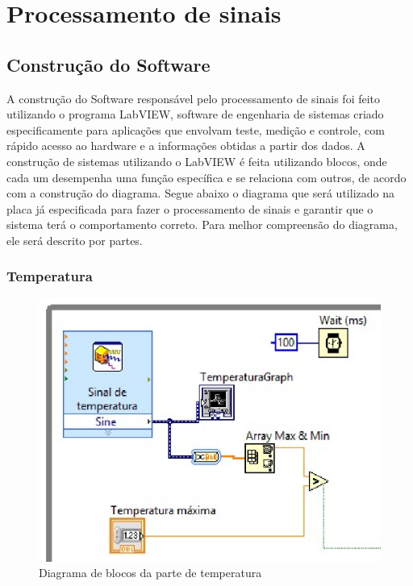 \newpage
\section{Processamento de sinais}


\subsection{Construção do Software}

A construção do Software responsável pelo processamento de sinais foi feito utilizando o programa LabVIEW, software de engenharia de sistemas criado especificamente para aplicações que envolvam teste, medição e controle, com rápido acesso ao hardware e a informações obtidas a partir dos dados.
A construção de sistemas utilizando o LabVIEW é feita utilizando blocos, onde cada um desempenha uma função específica e se relaciona com outros, de acordo com a construção do diagrama.
Segue abaixo o diagrama que será utilizado na placa já especificada para fazer o processamento de sinais e garantir que o sistema terá o comportamento correto. Para melhor compreensão do diagrama, ele será descrito por partes.

\subsubsection{Temperatura}

\begin{figure}[!htb]                                                             
    \centering                                                                      
    \includegraphics[scale=0.6, keepaspectratio=true]{figuras/detalhado/temp_labview.eps} 
    \caption{Diagrama de blocos da parte de temperatura}\label{temp1}
 \end{figure}

